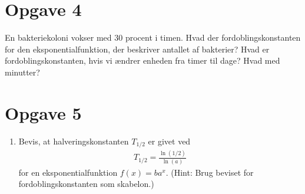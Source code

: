 \section*{Opgave 4}
En bakteriekoloni vokser med $30$ procent i timen. Hvad der fordoblingskonstanten for den eksponentialfunktion, der beskriver antallet af bakterier? Hvad er fordoblingskonstanten, hvis vi ændrer enheden fra timer til dage? Hvad med minutter?

\section*{Opgave 5}
\begin{enumerate}[label=\roman*)]
\item Bevis, at halveringskonstanten $T_{1/2}$ er givet ved 
\begin{align*}
T_{1/2} = \frac{\ln(1/2)}{\ln(a)}
\end{align*}
for en eksponentialfunktion $f(x) = ba^x$. (Hint: Brug beviset for fordoblingskonstanten som skabelon.)
\end{enumerate}